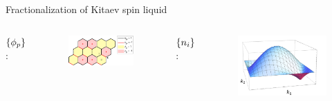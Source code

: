 \begin{frame}{Fractionalization of Kitaev spin liquid}
\begin{columns}[t]
        
        $\left\{\phi_p\right\}$:
        \begin{figure}
            \centering
            \begin{minipage}[l]{.7\textwidth}
                \includegraphics[width = 1\textwidth]{figures/lattice2.pdf}
            \end{minipage}
        \end{figure}
        \vspace{.5cm}
        $\left\{ n_i \right\}$:
        \begin{figure}
            \centering
            \begin{minipage}[l]{.6\textwidth}
                \includegraphics[width = 1\textwidth]{figures/torus_band.jpg}
            \end{minipage}
        \end{figure}
    \end{columns}
\end{frame}


